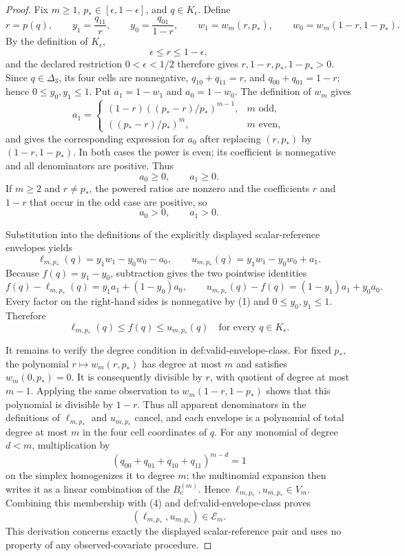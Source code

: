 \documentclass{article}
\begin{document}
\begin{proof}
Fix \(m\geq 1\), \(p_*\in[\epsilon,1-\epsilon]\), and \(q\in K_{\epsilon}\). Define
\[
r=p(q),\qquad y_1=\frac{q_{11}}{r},\qquad y_0=\frac{q_{01}}{1-r},
\qquad w_1=w_m(r,p_*),\qquad w_0=w_m(1-r,1-p_*).
\]
By the definition of \(K_{\epsilon}\),
\[
\epsilon\leq r\leq1-\epsilon,
\]
and the declared restriction \(0<\epsilon<1/2\) therefore gives
\(r,1-r,p_*,1-p_*>0\). Since \(q\in\Delta_3\), its four cells are
nonnegative, \(q_{10}+q_{11}=r\), and \(q_{00}+q_{01}=1-r\); hence
\(0\leq y_0,y_1\leq1\). Put \(a_1=1-w_1\) and \(a_0=1-w_0\). The
definition of \(w_m\) gives
\[
a_1=
\begin{cases}
(1-r)\left((p_*-r)/p_*\right)^{m-1},&m\text{ odd},\\
\left((p_*-r)/p_*\right)^m,&m\text{ even},
\end{cases}
\]
and gives the corresponding expression for \(a_0\) after replacing
\((r,p_*)\) by \((1-r,1-p_*)\). In both cases the power is even; its
coefficient is nonnegative and all denominators are positive. Thus
\[
a_0\geq0,\qquad a_1\geq0.                                      \tag{1}
\]
If \(m\geq2\) and \(r\neq p_*\), the powered ratios are nonzero and the
coefficients \(r\) and \(1-r\) that occur in the odd case are positive, so
\[
a_0>0,\qquad a_1>0.                                             \tag{2}
\]

Substitution into the definitions of the explicitly displayed scalar-reference
envelopes yields
\[
\ell_{m,p_*}(q)=y_1w_1-y_0w_0-a_0,
\qquad
u_{m,p_*}(q)=y_1w_1-y_0w_0+a_1.
\]
Because \(f(q)=y_1-y_0\), subtraction gives the two pointwise identities
\[
f(q)-\ell_{m,p_*}(q)=y_1a_1+(1-y_0)a_0,
\qquad
u_{m,p_*}(q)-f(q)=(1-y_1)a_1+y_0a_0.                             \tag{3}
\]
Every factor on the right-hand sides is nonnegative by (1) and
\(0\leq y_0,y_1\leq1\). Therefore
\[
\ell_{m,p_*}(q)\leq f(q)\leq u_{m,p_*}(q)
\quad\text{for every }q\in K_{\epsilon}.                         \tag{4}
\]

It remains to verify the degree condition in def:valid-envelope-class. For
fixed \(p_*\), the polynomial \(r\mapsto w_m(r,p_*)\) has degree at most
\(m\) and satisfies \(w_m(0,p_*)=0\). It is consequently divisible by
\(r\), with quotient of degree at most \(m-1\). Applying the same observation
to \(w_m(1-r,1-p_*)\) shows that this polynomial is divisible by \(1-r\).
Thus all apparent denominators in the definitions of \(\ell_{m,p_*}\) and
\(u_{m,p_*}\) cancel, and each envelope is a polynomial of total degree at
most \(m\) in the four cell coordinates of \(q\). For any monomial of degree
\(d<m\), multiplication by
\[
(q_{00}+q_{01}+q_{10}+q_{11})^{m-d}=1
\]
on the simplex homogenizes it to degree \(m\); the multinomial expansion then
writes it as a linear combination of the \(B_c^{(m)}\). Hence
\(\ell_{m,p_*},u_{m,p_*}\in V_m\). Combining this membership with (4) and
def:valid-envelope-class proves
\[
(\ell_{m,p_*},u_{m,p_*})\in\mathcal E_m.                          \tag{5}
\]
This derivation concerns exactly the displayed scalar-reference pair and uses
no property of any observed-covariate procedure.


\end{proof}
\end{document}

